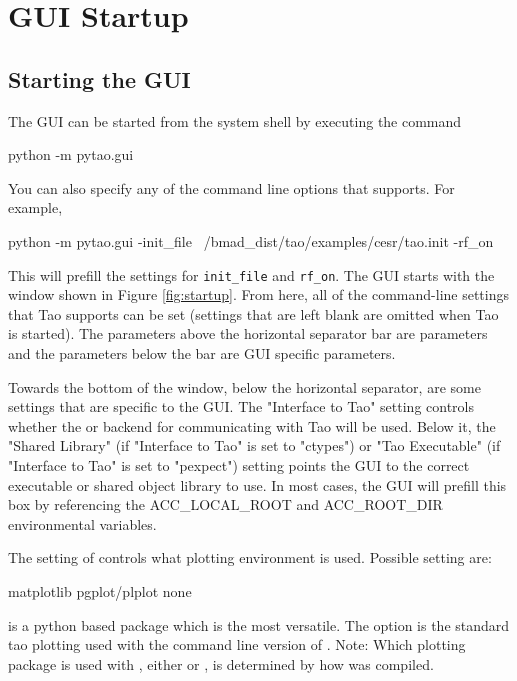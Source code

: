 \chapter{GUI Startup}
\label{s:gui.startup}

\section{Starting the GUI}

The GUI can be started from the system shell by executing the command
\begin{example}
  python -m pytao.gui
\end{example}
You can also specify any of the command line options that \tao supports.  For example,
\begin{example}
  python -m pytao.gui -init_file ~/bmad_dist/tao/examples/cesr/tao.init -rf_on
\end{example}
This will prefill the settings for \texttt{init_file} and \texttt{rf_on}. The GUI starts with the
window shown in Figure \ref{fig:startup}. From here, all of the command-line settings that Tao
supports can be set (settings that are left blank are omitted when Tao is started). The parameters
above the horizontal separator bar are \tao parameters and the parameters below the bar are GUI
specific parameters.

Towards the bottom of the window, below the horizontal separator, are some settings that are
specific to the GUI.  The "Interface to Tao" setting controls whether the  or
 backend for communicating with Tao will be used.  Below it, the "Shared Library" (if
"Interface to Tao" is set to "ctypes") or "Tao Executable" (if "Interface to Tao" is set to
"pexpect") setting points the GUI to the correct executable or shared object library to use.  In
most cases, the GUI will prefill this box by referencing the ACC_LOCAL_ROOT and ACC_ROOT_DIR
environmental variables.

The setting of  controls what plotting environment is used. Possible setting are:
\begin{example}
  matplotlib
  pgplot/plplot
  none
\end{example}
 is a python based package which is the most versatile. The  option
is the standard tao plotting used with the command line version of \tao. Note: Which plotting package is
used with , either  or , is determined by how \tao was compiled.

